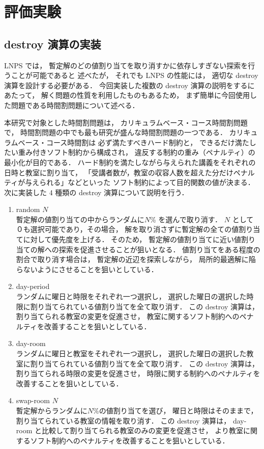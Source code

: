 \section{評価実験}

\subsection{destroy 演算の実装}
LNPS では，
暫定解のどの値割り当てを取り消すかに依存しすぎない探索を行うことが可能であると
述べたが，
それでも LNPS の性能には，
適切な destroy 演算を設計する必要がある．
今回実装した複数の destroy 演算の説明をするにあたって，
解く問題の性質を利用したものもあるため，
まず簡単に今回使用した問題である時間割問題について述べる．

本研究で対象とした時間割問題は，
カリキュラムベース・コース時間割問題で，
時間割問題の中でも最も研究が盛んな時間割問題の一つである．
カリキュラムベース・コース時間割は
必ず満たすべきハード制約と，
できるだけ満たしたい重み付きソフト制約から構成され，
違反する制約の重み（ペナルティ）の最小化が目的である．
ハード制約を満たしながら与えられた講義をそれぞれの日時と教室に割り当て，
「受講者数が，教室の収容人数を超えた分だけペナルティが与えられる」などといった
ソフト制約によって目的関数の値が決まる．\\

次に実装した 4 種類の destroy 演算について説明を行う．
    \begin{enumerate}
    \item random $N$\\
       暫定解の値割り当ての中からランダムに$N$\% を選んで取り消す．
       $N$ として０も選択可能であり，その場合，
       解を取り消さずに暫定解の全ての値割り当てに対して優先度を上げる．
       そのため，
       暫定解の値割り当てに近い値割り当ての解への探索を促進させることが狙いとなる．
       値割り当てをある程度の割合で取り消す場合は，
       暫定解の近辺を探索しながら，
       局所的最適解に陥らないようにさせることを狙いとしている．
    \item day-period\\
      ランダムに曜日と時限をそれぞれ一つ選択し，
      選択した曜日の選択した時限に割り当てられている値割り当てを全て取り消す．
      この destroy 演算は，
      割り当てられる教室の変更を促進させ，
      教室に関するソフト制約へのペナルティを改善することを狙いとしている．
  \item day-room\\
   ランダムに曜日と教室をそれぞれ一つ選択し，
   選択した曜日の選択した教室に割り当てられている値割り当てを全て取り消す．
   この destroy 演算は，
   割り当てられる時限の変更を促進させ，
   時限に関する制約へのペナルティを改善することを狙いとしている．
  \item swap-room $N$\\
    暫定解からランダムに$N$\%の値割り当てを選び，
    曜日と時限はそのままで，割り当てられている教室の情報を取り消す．
   この destroy 演算は，
   day-room と比較して割り当てられる教室のみの変更を促進させ，
   より教室に関するソフト制約へのペナルティを改善することを狙いとしている．
    
  \end{enumerate}


